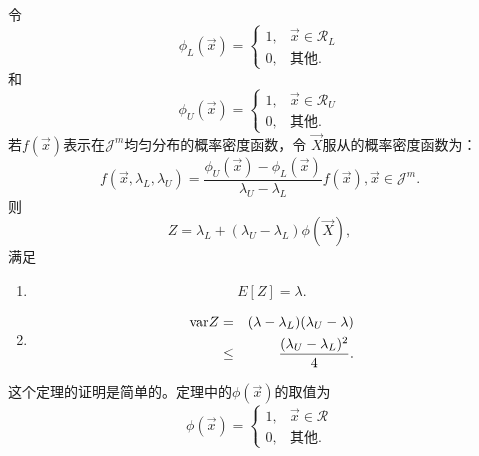 \begin{theorem}{}
  令
  \begin{equation}
    \phi_L(\vec{x}) = \left\{
    \begin{array}{ll}
      1,& \vec{x} \in \mathscr{R}_L\\
      0,& \mbox{其他}.
      \end{array}
      \right.
      \label{eq::sta_L}
  \end{equation}
  和
  \begin{equation}
  \phi_U(\vec{x}) = \left\{
  \begin{array}{ll}
    1,& \vec{x} \in \mathscr{R}_U\\
    0,& \mbox{其他}.
    \end{array}
    \right.
    \label{eq::sta_U}
  \end{equation}
  若$f(\vec{x})$表示在$\mathscr{J}^m$均匀分布的概率密度函数，令
  $\vec{X}$服从的概率密度函数为：
  \begin{equation}
    f(\vec{x}, \lambda_L, \lambda_U) = \frac{\phi_U(\vec{x}) -
      \phi_L(\vec{x})}{\lambda_U - \lambda_L}f(\vec{x}), \vec{x} \in
    \mathscr{J}^m.
    \label{eq::hyperrectangle_pdf}
  \end{equation}
  则
  \begin{equation}
    Z = \lambda_L + (\lambda_U - \lambda_L) \phi(\vec{X}),
    \label{eq::hyper_est}
  \end{equation}
  满足
  \begin{enumerate}
  \item
    \begin{equation}
      E[Z] = \lambda.
      \label{eq::hyper_exp}
    \end{equation}
  \item
    \begin{eqnarray}
      \mathrm{var} Z & = & (\lambda - \lambda_L)(\lambda_U - \lambda)
      \label{eq::hyper_var}
      \\
      & \leq & \frac{(\lambda_U - \lambda_L)^2}{4}. \notag
    \end{eqnarray}
  \end{enumerate}
    \label{thm::hyperrectangle}
\end{theorem}

这个定理的证明是简单的。定理中的$\phi(\vec{x})$的取值为
\begin{equation}
  \phi(\vec{x}) = \left\{
  \begin{array}{ll}
    1,& \vec{x} \in \mathscr{R}\\
    0,& \mbox{其他}.
  \end{array}
  \right.
  \label{eq::sta}
\end{equation}

